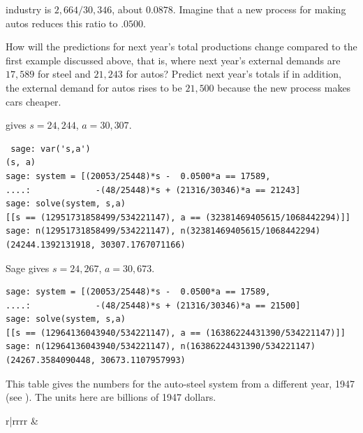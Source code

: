 \begin{exercises}
    industry is $2,664/30,346$, about $0.0878$.
    Imagine that a new process for making autos reduces this 
    ratio to $.0500$.
    \begin{exparts}
      \partsitem How will the predictions for next year's total
        productions change compared to the first example discussed
        above, that is, where next year's external demands are
        $17,589$ for steel and $21,243$ for autos?
      \partsitem Predict next year's totals if in addition,
        the external demand for
        autos rises to be $21,500$ because the new process makes 
        cars cheaper.
    \end{exparts}
    \begin{answer}
      \begin{exparts}
        \partsitem \Sage{} gives  $s=24,244$, $a=30,307$.
\begin{lstlisting}
 sage: var('s,a')
(s, a)
sage: system = [(20053/25448)*s -  0.0500*a == 17589,
....:             -(48/25448)*s + (21316/30346)*a == 21243]
sage: solve(system, s,a)
[[s == (12951731858499/534221147), a == (32381469405615/1068442294)]]
sage: n(12951731858499/534221147), n(32381469405615/1068442294)
(24244.1392131918, 30307.1767071166)         
\end{lstlisting}
        \partsitem Sage gives $s=24,267$, $a=30,673$.
\begin{lstlisting}
sage: system = [(20053/25448)*s -  0.0500*a == 17589,
....:             -(48/25448)*s + (21316/30346)*a == 21500]
sage: solve(system, s,a)
[[s == (12964136043940/534221147), a == (16386224431390/534221147)]]
sage: n(12964136043940/534221147), n(16386224431390/534221147)
(24267.3584090448, 30673.1107957993)          
\end{lstlisting}
      \end{exparts}
    \end{answer}
  \item 
    This table gives the numbers for the auto-steel system from
    a different year, 1947 (see \cite{Leontief1951}).
    The units here are billions of 1947 dollars.
    \begin{center}
      \begin{tabular}{r|rrrr}
             &

\end{tabular}
\end{center}
\end{exercises}

